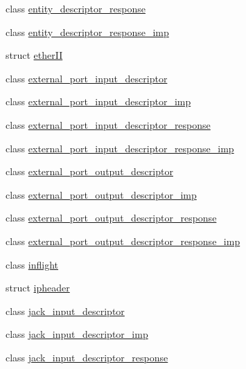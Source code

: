\begin{DoxyCompactItemize}
\item 
class \hyperlink{classavdecc__lib_1_1entity__descriptor__response}{entity\+\_\+descriptor\+\_\+response}
\item 
class \hyperlink{classavdecc__lib_1_1entity__descriptor__response__imp}{entity\+\_\+descriptor\+\_\+response\+\_\+imp}
\item 
struct \hyperlink{structavdecc__lib_1_1ether_i_i}{ether\+II}
\item 
class \hyperlink{classavdecc__lib_1_1external__port__input__descriptor}{external\+\_\+port\+\_\+input\+\_\+descriptor}
\item 
class \hyperlink{classavdecc__lib_1_1external__port__input__descriptor__imp}{external\+\_\+port\+\_\+input\+\_\+descriptor\+\_\+imp}
\item 
class \hyperlink{classavdecc__lib_1_1external__port__input__descriptor__response}{external\+\_\+port\+\_\+input\+\_\+descriptor\+\_\+response}
\item 
class \hyperlink{classavdecc__lib_1_1external__port__input__descriptor__response__imp}{external\+\_\+port\+\_\+input\+\_\+descriptor\+\_\+response\+\_\+imp}
\item 
class \hyperlink{classavdecc__lib_1_1external__port__output__descriptor}{external\+\_\+port\+\_\+output\+\_\+descriptor}
\item 
class \hyperlink{classavdecc__lib_1_1external__port__output__descriptor__imp}{external\+\_\+port\+\_\+output\+\_\+descriptor\+\_\+imp}
\item 
class \hyperlink{classavdecc__lib_1_1external__port__output__descriptor__response}{external\+\_\+port\+\_\+output\+\_\+descriptor\+\_\+response}
\item 
class \hyperlink{classavdecc__lib_1_1external__port__output__descriptor__response__imp}{external\+\_\+port\+\_\+output\+\_\+descriptor\+\_\+response\+\_\+imp}
\item 
class \hyperlink{classavdecc__lib_1_1inflight}{inflight}
\item 
struct \hyperlink{structavdecc__lib_1_1ipheader}{ipheader}
\item 
class \hyperlink{classavdecc__lib_1_1jack__input__descriptor}{jack\+\_\+input\+\_\+descriptor}
\item 
class \hyperlink{classavdecc__lib_1_1jack__input__descriptor__imp}{jack\+\_\+input\+\_\+descriptor\+\_\+imp}
\item 
class \hyperlink{classavdecc__lib_1_1jack__input__descriptor__response}{jack\+\_\+input\+\_\+descriptor\+\_\+response}
\item 

\end{DoxyCompactItemize}
